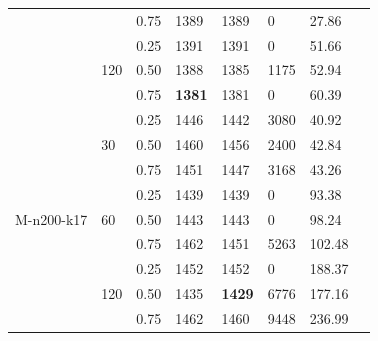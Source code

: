 \begin{table}[h!]
\begin{threeparttable}
\begin{tabularx}{0.45\textwidth}{ l X X X X X X X}
                                        &                       & 0.75  & 1389 & 1389 & 0 & 27.86\\ [0.5ex]
            \cmidrule{2-7}
                                        & \multirow{3}{*}{120}  & 0.25  & 1391 & 1391 & 0 & 51.66\\ [0.5ex]
                                        &                       & 0.50  & 1388 & 1385 & 1175 & 52.94\\ [0.5ex]
                                        &                       & 0.75  & \textbf{1381} & 1381 & 0 & 60.39\\ [0.5ex]
            \midrule
            \multirow{9}{*}{M-n200-k17} & \multirow{3}{*}{30}   & 0.25  & 1446 & 1442 & 3080 & 40.92\\ [0.5ex]
                                        &                       & 0.50  & 1460 & 1456 & 2400 & 42.84\\ [0.5ex]
                                        &                       & 0.75  & 1451 & 1447 & 3168 & 43.26\\ [0.5ex]
            \cmidrule{2-7}
                                        & \multirow{3}{*}{60}   & 0.25  & 1439 & 1439 & 0 & 93.38\\ [0.5ex]
                                        &                       & 0.50  & 1443 & 1443 & 0 & 98.24\\ [0.5ex]
                                        &                       & 0.75  & 1462 & 1451 & 5263 & 102.48\\ [0.5ex]
            \cmidrule{2-7}
                                        & \multirow{3}{*}{120}  & 0.25  & 1452 & 1452 & 0 & 188.37\\ [0.5ex]
                                        &                       & 0.50  & 1435 & \textbf{1429} & 6776 & 177.16\\ [0.5ex]
                                        &                       & 0.75  & 1462 & 1460 & 9448 & 236.99\\ [0.5ex]
            \bottomrule
        \end{tabularx}

\end{threeparttable}
\end{table}
